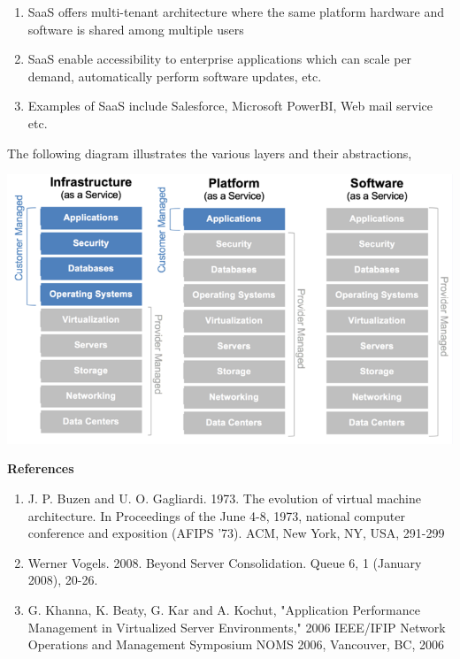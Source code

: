 \documentclass[11pt,a4paper,oneside]{article}
\begin{document}
\begin{enumerate}
\begin{enumerate}
             	\item SaaS offers multi-tenant architecture where the same platform hardware and software is shared among multiple users 
             	\item SaaS enable accessibility to enterprise applications which can scale per demand, automatically perform software updates, etc.
             	\item Examples of SaaS include Salesforce, Microsoft PowerBI, Web mail service etc.
             \end{enumerate} 
         
             The following diagram illustrates the various layers and their abstractions,      
          
	         \begin{center}
	            \includegraphics[scale=0.6]{1.png}	
	         \end{center}
		
		
		 			
				
	\end{enumerate}
    
    \textbf{References}
    \begin{enumerate}
    	\item J. P. Buzen and U. O. Gagliardi. 1973. The evolution of virtual machine architecture. In Proceedings of the June 4-8, 1973, national computer conference and exposition (AFIPS '73). ACM, New York, NY, USA, 291-299
    	\item Werner Vogels. 2008. Beyond Server Consolidation. Queue 6, 1 (January 2008), 20-26. 
    	\item G. Khanna, K. Beaty, G. Kar and A. Kochut, "Application Performance Management in Virtualized Server Environments," 2006 IEEE/IFIP Network Operations and Management Symposium NOMS 2006, Vancouver, BC, 2006   	
    \end{enumerate}
 

    
\end{document}
